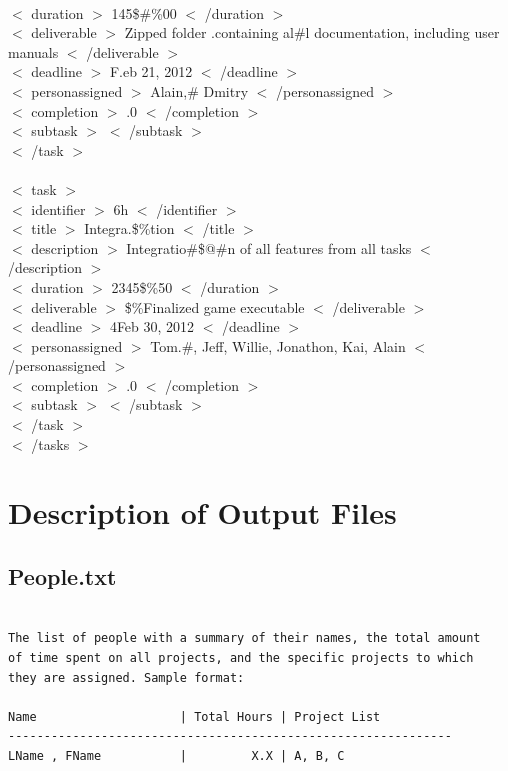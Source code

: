 \documentclass[12pt]{article}
\newcommand{\tab}{\hspace*{2em}}
\begin{document}
{\\ \tab    \tab $<$ duration $>$ 145\$\#\%00 $<$ /duration $>$ 
\\ \tab    \tab $<$ deliverable $>$ Zipped folder .containing al\#l documentation, including user manuals $<$ /deliverable $>$ 
\\ \tab    \tab $<$ deadline $>$ F.eb 21, 2012 $<$ /deadline $>$ 
\\ \tab    \tab $<$ personassigned $>$ Alain,\# Dmitry $<$ /personassigned $>$ 
\\ \tab    \tab $<$ completion $>$ .0 $<$ /completion $>$ 
\\ \tab    \tab $<$ subtask $>$  $<$ /subtask $>$ 
\\ \tab$<$ /task $>$ 
\\ 
\\ \tab$<$ task $>$ 
\\ \tab    \tab $<$ identifier $>$ 6h $<$ /identifier $>$ 
\\ \tab    \tab $<$ title $>$ Integra.\$\%tion $<$ /title $>$ 
\\ \tab    \tab $<$ description $>$ Integratio\#\$@\#n of all features from all tasks $<$ /description $>$ 
\\ \tab    \tab $<$ duration $>$ 2345\$\%50 $<$ /duration $>$ 
\\ \tab    \tab $<$ deliverable $>$ \$\%Finalized game executable $<$ /deliverable $>$ 
\\ \tab    \tab $<$ deadline $>$ 4Feb 30, 2012 $<$ /deadline $>$ 
\\ \tab    \tab $<$ personassigned $>$ Tom.\#, Jeff, Willie, Jonathon, Kai, Alain $<$ /personassigned $>$ 
\\ \tab    \tab $<$ completion $>$ .0 $<$ /completion $>$ 
\\ \tab    \tab $<$ subtask $>$  $<$ /subtask $>$ 
\\ \tab$<$ /task $>$ 
\\ $<$ /tasks $>$ 
}

\section{Description of Output Files}
\subsection{People.txt}
\begin{lstlisting}

The list of people with a summary of their names, the total amount
of time spent on all projects, and the specific projects to which
they are assigned. Sample format:

Name                    | Total Hours | Project List
--------------------------------------------------------------
LName , FName           |         X.X | A, B, C

\end{lstlisting}
\end{document}
